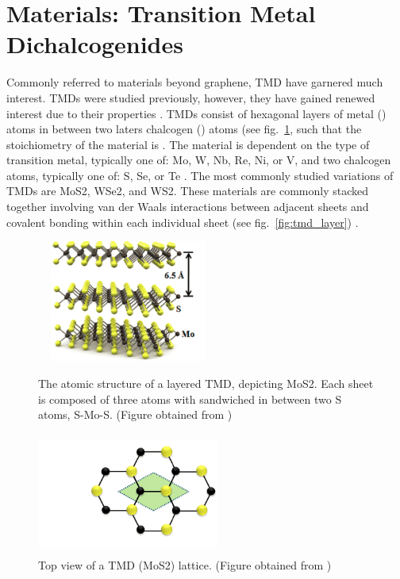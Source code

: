 \section{\Td Materials: Transition Metal Dichalcogenides}\label{sec:tmds}
Commonly referred to \td materials beyond graphene, \ac{TMD} have garnered much interest. \acp{TMD} were studied previously, however, they have gained renewed interest due to their properties \cite{Frindt_Royal1963,Fivaz_PhysRev1967,Mattheiss_PhysRevB1973,Wilson_AdvPhys1969}. \acp{TMD} consist of hexagonal layers of metal () atoms in between two laters chalcogen () atoms (see fig.~\ref{fig:tmd_hexagonal}, such that the stoichiometry of the material is  \cite{Xu_ChemRev2013}. The material is dependent on the type of transition metal, typically one of: \ac{Mo}, \ac{W}, \ac{Nb}, \ac{Re}, \ac{Ni}, or \ac{V}, and two chalcogen atoms, typically one of: \ac{S}, \ac{Se}, or \ac{Te} \cite{Wilson_AdvPhys1969,Wells_Oxford1984}. The most commonly studied variations of \acp{TMD} are \ac{MoS2}, \ac{WSe2}, and \ac{WS2}. These materials are commonly stacked together involving van der Waals interactions between adjacent sheets and covalent bonding within each individual sheet (see fig.~\ref{fig:tmd_layer}) \cite{Xu_ChemRev2013}.
\begin{figure}[ht]
	\centering
	\begin{minipage}[b]{0.45\linewidth}
		\includegraphics[height=4cm,width=6cm]{figs/intro/tmdlayered}
		\caption[Layered \acs{TMD} diagram]{The atomic structure of a layered \acs{TMD}, depicting \acs{MoS2}. Each sheet is composed of three atoms with  sandwiched in between two \acs{S} atoms, \acs{S}-\acs{Mo}-\acs{S}. (Figure obtained from \cite{Kis_NatureNano2011})}
		\label{fig:tmd_layer}
	\end{minipage}
	\qquad
	\begin{minipage}[b]{0.45\linewidth}
		\includegraphics[height=4cm,width=6cm]{figs/intro/tmdhexagonal}
		\caption[Hexagonal lattice of \acs{TMD}]{Top view of a \acs{TMD} (\acs{MoS2}) lattice. (Figure obtained from \cite{Kis_NatureNano2011})}
		\label{fig:tmd_hexagonal}
	\end{minipage}
\end{figure}
